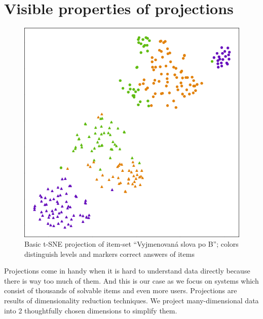\documentclass[
  digital, %
  table,   %
  nolof,     %
  nolot,     %
  nocover,
  color,
  final, %
]{fithesis3}
\begin{document}


\section{Visible properties of projections}\label{visible-properties-of-projections}

\begin{figure}
    \includegraphics[width=\textwidth]{img/common_projection}
  \caption{Basic t-SNE projection of item-set ``Vyjmenovaná slova po B''; colors distinguish levels and markers correct answers of items}
  \label{fig:common_projection}
\end{figure}


Projections come in handy when it is hard to understand data directly because there is way too much of them. And this is our case as we focus on systems which consist of thousands of solvable items and even more users. Projections are results of dimensionality reduction techniques. We project many-dimensional data into 2 thoughtfully chosen dimensions to simplify them.

\end{document}

